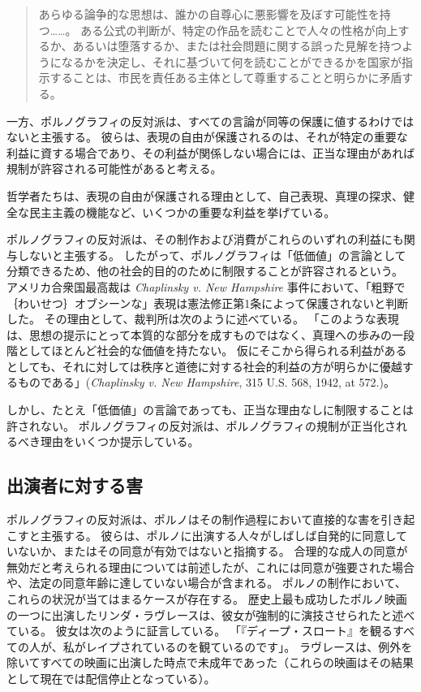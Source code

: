 \documentclass[paper=a4,book,openany]{jlreq}
\begin{document}
\begin{quote}

あらゆる論争的な思想は、誰かの自尊心に悪影響を及ぼす可能性を持つ……。
ある公式の判断が、特定の作品を読むことで人々の性格が向上するか、あるいは堕落するか、または社会問題に関する誤った見解を持つようになるかを決定し、それに基づいて何を読むことができるかを国家が指示することは、市民を責任ある主体として尊重することと明らかに矛盾する。
\citep[pp.206--208]{dworkin96:_freed_law}

\end{quote}

一方、ポルノグラフィの反対派は、すべての言論が同等の保護に値するわけではないと主張する。
彼らは、表現の自由が保護されるのは、それが特定の重要な利益に資する場合であり、その利益が関係しない場合には、正当な理由があれば規制が許容される可能性があると考える。

哲学者たちは、表現の自由が保護される理由として、自己表現、真理の探求、健全な民主主義の機能など、いくつかの重要な利益を挙げている\citep{scanlon11:_why_not_base_free_speec_auton_democ}。

ポルノグラフィの反対派は、その制作および消費がこれらのいずれの利益にも関与しないと主張する。
したがって、ポルノグラフィは「低価値」の言論として分類できるため、他の社会的目的のために制限することが許容されるという。
アメリカ合衆国最高裁は \emph{Chaplinsky v. New Hampshire} 事件において、「粗野で｛わいせつ｝{オブシーン}な」表現は憲法修正第1条によって保護されないと判断した。
その理由として、裁判所は次のように述べている。
「このような表現は、思想の提示にとって本質的な部分を成すものではなく、真理への歩みの一段階としてほとんど社会的な価値を持たない。
仮にそこから得られる利益があるとしても、それに対しては秩序と道徳に対する社会的利益の方が明らかに優越するものである」(\emph{Chaplinsky v. New Hampshire}, 315 U.S. 568, 1942, at 572.)。

しかし、たとえ「低価値」の言論であっても、正当な理由なしに制限することは許されない。
ポルノグラフィの反対派は、ポルノグラフィの規制が正当化されるべき理由をいくつか提示している。

\subsection{出演者に対する害}

ポルノグラフィの反対派は、ポルノはその制作過程において直接的な害を引き起こすと主張する。
彼らは、ポルノに出演する人々がしばしば自発的に同意していないか、またはその同意が有効ではないと指摘する。
合理的な成人の同意が無効だと考えられる理由については前述したが、これには同意が強要された場合や、法定の同意年齢に達していない場合が含まれる。
ポルノの制作において、これらの状況が当てはまるケースが存在する。
歴史上最も成功したポルノ映画の一つに出演したリンダ・ラヴレースは、彼女が強制的に演技させられたと述べている。
彼女は次のように証言している。
「『ディープ・スロート』を観るすべての人が、私がレイプされているのを観ているのです」\citep{bailey05:_insid_deep_throat}。
ラヴレースは、例外を除いてすべての映画に出演した時点で未成年であった（これらの映画はその結果として現在では配信停止となっている）。
\end{document}
